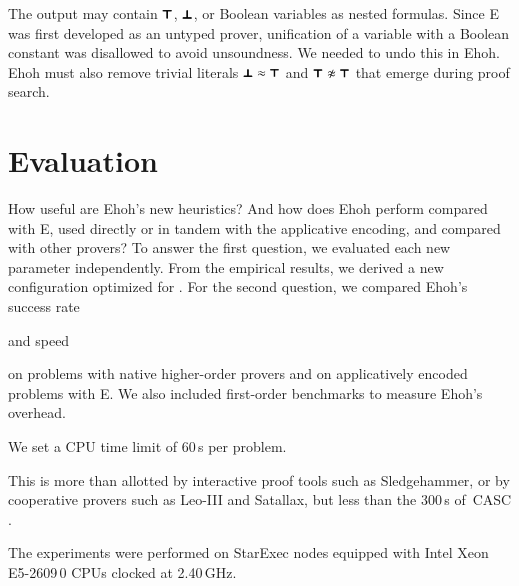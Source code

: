 \begin{rep}
The output may contain $\pmb\top$, $\pmb\bot$, or Bool\-ean
variables as nested formulas. Since E was first developed as an untyped prover,
unification of a variable with a Boolean constant was disallowed to avoid
unsoundness. We needed to undo this in Ehoh. Ehoh must also remove trivial
literals $\pmb\bot \approx \pmb\top$ and $\itrue \noteq
\itrue$ that emerge during proof search.
\end{rep}

\section{Evaluation}
\label{sec:ehoh:evaluation}

How useful are Ehoh's new heuristics? And how does Ehoh perform compared with
E, used directly or in tandem with the
applicative encoding, and compared with other provers?
To answer the first question, we evaluated each new parameter independently. From
the empirical results, we derived a new configuration optimized for \lfhol{}.
For the second question, we compared Ehoh's success
rate\begin{rep} and speed\end{rep} on \lfhol{} problems with
native higher-order provers and
on applicatively encoded problems with E. We also included first-order
benchmarks to measure Ehoh's overhead.

We set a CPU time limit of 60\,s per problem.
\begin{rep}%
This is more than allotted by interactive proof tools such as Sledgehammer, or
by cooperative provers such as Leo-III and Satallax, but less than the 300\,s
of~CASC \cite{gs-17-casc}.
\end{rep}%
The experiments were performed on StarExec \cite{sst-14-starexec}
nodes equipped with Intel Xeon E5-2609\,0 CPUs clocked at 2.40\,GHz.


